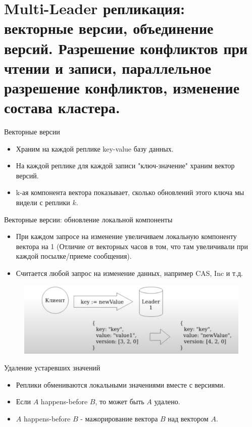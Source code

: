 \section{Multi-Leader репликация: векторные версии, объединение версий. Разрешение конфликтов при чтении и записи, параллельное разрешение конфликтов, изменение состава кластера.}

\begin{definition}
  Векторные версии
\end{definition}
\begin{itemize}
  \item Храним на каждой реплике key-value базу данных.
  \item На каждой реплике для каждой записи "ключ-значение" храним вектор
  версий.
  \item k-ая компонента вектора показывает, сколько обновлений этого ключа мы видели с реплики $k$.
\end{itemize}
\begin{definition}
  Векторные версии: обновление локальной компоненты
\end{definition}
\begin{itemize}
  \item При каждом запросе на изменение увеличиваем локальную компоненту вектора на 1 (Отличие от векторных часов в том, что там увеличивали при каждой посылке/приеме сообщения).
  \item Считается любой запрос на изменение данных, например CAS, Inc и т.д.
\end{itemize}
\begin{figure}[h]
    \centering
    \includegraphics[scale = 0.5]{../assets/1.png}
    \caption{}
\end{figure}
\begin{definition}
  Удаление устаревших значений
\end{definition}
\begin{itemize}
  \item Реплики обмениваются локальными значениями вместе с версиями.
  \item Если $A$ happens-before $B$, то может быть $A$ удалено.
  \item $A$ happens-before $B$ - мажорирование вектора $B$ над вектором $A$.
\end{itemize}
